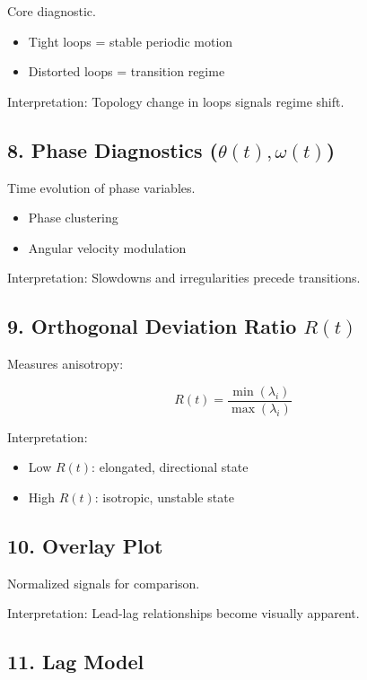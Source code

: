 \documentclass[11pt]{article}
\begin{document}
Core diagnostic.

\begin{itemize}
\item Tight loops = stable periodic motion
\item Distorted loops = transition regime
\end{itemize}

Interpretation:
Topology change in loops signals regime shift.

\subsection{8. Phase Diagnostics ($\theta(t), \omega(t)$)}

Time evolution of phase variables.

\begin{itemize}
\item Phase clustering
\item Angular velocity modulation
\end{itemize}

Interpretation:
Slowdowns and irregularities precede transitions.

\subsection{9. Orthogonal Deviation Ratio $R(t)$}

Measures anisotropy:

\begin{equation}
R(t) = \frac{\min(\lambda_i)}{\max(\lambda_i)}
\end{equation}

Interpretation:
\begin{itemize}
\item Low $R(t)$: elongated, directional state
\item High $R(t)$: isotropic, unstable state
\end{itemize}

\subsection{10. Overlay Plot}

Normalized signals for comparison.

Interpretation:
Lead-lag relationships become visually apparent.

\subsection{11. Lag Model}
\end{document}
